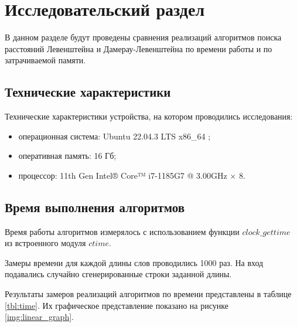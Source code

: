 \chapter{Исследовательский раздел}

В данном разделе будут проведены сравнения реализаций алгоритмов поиска расстояний Левенштейна и Дамерау-Левенштейна по времени работы и по затрачиваемой памяти.

\section{Технические характеристики}

Технические характеристики устройства, на котором проводились исследования: 

\begin{itemize}[label=--]
	\item операционная система: Ubuntu 22.04.3 LTS x86\_64 \cite{os};
	\item оперативная память: 16 Гб;
	\item процессор: 11th Gen Intel® Core™ i7-1185G7 @ 3.00GHz × 8.
\end{itemize}

\section{Время выполнения алгоритмов}

Время работы алгоритмов измерялось с использованием функции $clock\_gettime$ из встроенного модуля $ctime$. 

Замеры времени для каждой длины слов проводились 1000 раз. На вход подавались случайно сгенерированные строки заданной длины. 

Результаты замеров реализаций алгоритмов по времени представлены в таблице \ref{tbl:time}. Их графическое представление показано на рисунке \ref{img:linear_graph}.

